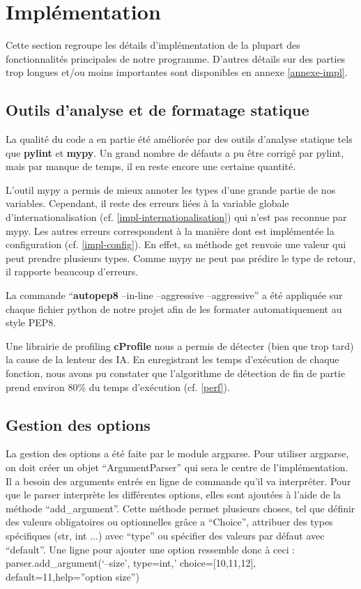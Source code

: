 \documentclass[12pt]{article}
\begin{document}
\newpage
\section{Implémentation}

Cette section regroupe les détails d'implémentation de la plupart des fonctionnalités principales de notre programme. D'autres détails sur des parties trop longues et/ou moins importantes sont disponibles en annexe \ref{annexe-impl}.
\subsection{Outils d'analyse et de formatage statique}

La qualité du code a en partie été améliorée par des outils d’analyse statique tels que \textbf{pylint} et \textbf{mypy}. Un grand nombre de défauts a pu être corrigé par pylint, mais par manque de temps, il en reste encore une certaine quantité.

\bigskip
L’outil mypy a permis de mieux annoter les types d’une grande partie de nos variables. Cependant, il reste des erreurs liées à la variable globale d’internationalisation (cf. \ref{impl-internationalisation}) qui n’est pas reconnue par mypy. Les autres erreurs correspondent à la manière dont est implémentée la configuration (cf.  \ref{impl-config}). En effet, sa méthode get renvoie une valeur qui peut prendre plusieurs types. Comme mypy ne peut pas prédire le type de retour, il rapporte beaucoup d'erreurs.

\bigskip
La commande “\textbf{autopep8} –in-line –aggressive –aggressive” a été appliquée sur chaque fichier python de notre projet afin de les formater automatiquement au style PEP8.

\bigskip
Une librairie de profiling \textbf{cProfile} nous a permis de détecter (bien que trop tard) la cause de la lenteur des IA. En enregistrant les temps d’exécution de chaque fonction, nous avons pu constater que l’algorithme de détection de fin de partie prend environ 80\% du temps d’exécution (cf. \ref{perf}).

\subsection{Gestion des options}

La gestion des options a été faite par le module argparse. Pour utiliser argparse, on doit créer un objet “ArgumentParser” qui sera le centre de l'implémentation. Il a besoin des arguments entrés en ligne de commande qu'il va interpréter. Pour que le parser interprète les différentes options, elles sont ajoutées à l’aide de la méthode “add\_argument”. Cette méthode permet plusieurs choses, tel que définir des valeurs obligatoires ou optionnelles grâce a “Choice”, attribuer des types spécifiques (str, int ...) avec “type” ou spécifier des valeurs par défaut avec “default”. Une ligne pour ajouter une option ressemble donc à ceci : parser.add\_argument(‘--size’, type=int,’ choice=[10,11,12], default=11,help=”option size”)
\end{document}

